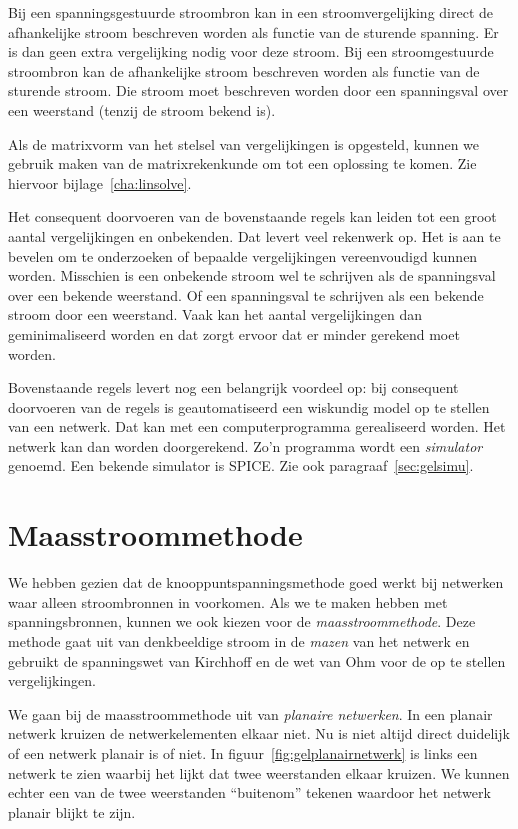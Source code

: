 Bij een spanningsgestuurde stroombron kan in een stroomvergelijking direct de afhankelijke stroom beschreven worden als functie van de sturende spanning. Er is dan geen extra vergelijking nodig voor deze stroom. Bij een stroomgestuurde stroombron kan de afhankelijke stroom beschreven worden als functie van de sturende stroom. Die stroom moet beschreven worden door een spanningsval over een weerstand (tenzij de stroom bekend is).

Als de matrixvorm van het stelsel van vergelijkingen is opgesteld, kunnen we gebruik maken van de matrixrekenkunde om tot een oplossing te komen. Zie hiervoor bijlage~\ref{cha:linsolve}.

Het consequent doorvoeren van de bovenstaande regels kan leiden tot een groot aantal vergelijkingen en onbekenden. Dat levert veel rekenwerk op. Het is aan te bevelen om te onderzoeken of bepaalde vergelijkingen vereenvoudigd kunnen worden. Misschien is een onbekende stroom wel te schrijven als de spanningsval over een bekende weerstand. Of een spanningsval te schrijven als een bekende stroom door een weerstand. Vaak kan het aantal vergelijkingen dan geminimaliseerd worden en dat zorgt ervoor dat er minder gerekend moet worden.

Bovenstaande regels levert nog een belangrijk voordeel op: bij consequent doorvoeren van de regels is geautomatiseerd een wiskundig model op te stellen van een netwerk. Dat kan met een computerprogramma gerealiseerd worden. Het netwerk kan dan worden doorgerekend. Zo'n programma wordt een \textsl{simulator} genoemd. Een bekende simulator is SPICE. Zie ook paragraaf~\ref{sec:gelsimu}.

\fi
\ifmaasstroom

\section{Maasstroommethode}
We hebben gezien dat de knooppuntspanningsmethode goed werkt bij netwerken waar alleen stroombronnen in voorkomen. Als we te maken hebben met spanningsbronnen, kunnen we ook kiezen voor de \textsl{maasstroommethode}. Deze methode gaat uit van denkbeeldige stroom in de \textsl{mazen} van het netwerk en gebruikt de spanningswet van Kirchhoff en de wet van Ohm voor de op te stellen vergelijkingen.

We gaan bij de maasstroommethode uit van \textsl{planaire netwerken}. In een planair netwerk kruizen de netwerkelementen elkaar niet. Nu is niet altijd direct duidelijk of een netwerk planair is of niet. In figuur~\ref{fig:gelplanairnetwerk} is links een netwerk te zien waarbij het lijkt dat twee weerstanden elkaar kruizen. We kunnen echter een van de twee weerstanden ``buitenom'' tekenen waardoor het netwerk planair blijkt te zijn.

